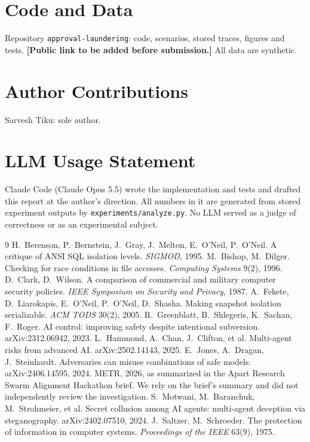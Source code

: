 \documentclass[10pt]{article}
\begin{document}
\section*{Code and Data}
Repository \texttt{approval-laundering}: code, scenarios, stored traces, figures and tests. \textbf{[Public link to be added before submission.]} All data are synthetic.

\section*{Author Contributions}
Sarvesh Tiku: sole author.

\section*{LLM Usage Statement}
Claude Code (Claude Opus 5.5) wrote the implementation and tests and drafted this report at the author's direction. All numbers in it are generated from stored experiment outputs by \texttt{experiments/analyze.py}. No LLM served as a judge of correctness or as an experimental subject.

\begin{thebibliography}{9}\small\setlength{\itemsep}{1pt}
 H.~Berenson, P.~Bernstein, J.~Gray, J.~Melton, E.~O'Neil, P.~O'Neil. A critique of ANSI SQL isolation levels. \emph{SIGMOD}, 1995.
 M.~Bishop, M.~Dilger. Checking for race conditions in file accesses. \emph{Computing Systems} 9(2), 1996.
 D.~Clark, D.~Wilson. A comparison of commercial and military computer security policies. \emph{IEEE Symposium on Security and Privacy}, 1987.
 A.~Fekete, D.~Liarokapis, E.~O'Neil, P.~O'Neil, D.~Shasha. Making snapshot isolation serializable. \emph{ACM TODS} 30(2), 2005.
 R.~Greenblatt, B.~Shlegeris, K.~Sachan, F.~Roger. AI control: improving safety despite intentional subversion. arXiv:2312.06942, 2023.
 L.~Hammond, A.~Chan, J.~Clifton, et al. Multi-agent risks from advanced AI. arXiv:2502.14143, 2025.
 E.~Jones, A.~Dragan, J.~Steinhardt. Adversaries can misuse combinations of safe models. arXiv:2406.14595, 2024.
 METR, 2026, as summarized in the Apart Research Swarm Alignment Hackathon brief. We rely on the brief's summary and did not independently review the investigation.
 S.~Motwani, M.~Baranchuk, M.~Strohmeier, et al. Secret collusion among AI agents: multi-agent deception via steganography. arXiv:2402.07510, 2024.
 J.~Saltzer, M.~Schroeder. The protection of information in computer systems. \emph{Proceedings of the IEEE} 63(9), 1975.
\end{thebibliography}
\end{document}
